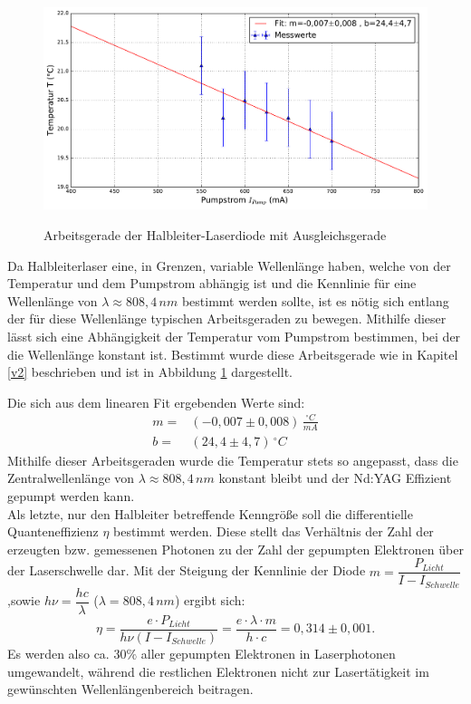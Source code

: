 \documentclass[twoside,colorback,accentcolor=tud4c,11pt]{tudreport}
\begin{document}
\begin{figure}[H]
\centering
   	\begin{minipage}[b]{0.85\textwidth}
   	\includegraphics[width=\textwidth]{graphics/arbeitsgerade_hld.pdf}
  	\label{ad}
   	\end{minipage}
\caption{Arbeitsgerade der Halbleiter-Laserdiode mit Ausgleichsgerade}	
\end{figure}
Da Halbleiterlaser eine, in Grenzen, variable Wellenlänge haben, welche von der Temperatur und dem Pumpstrom abhängig ist und die Kennlinie für eine Wellenlänge von $\lambda\approx 808,4\,\si{nm}$ bestimmt werden sollte, ist es nötig sich entlang der für diese Wellenlänge typischen Arbeitsgeraden zu bewegen. Mithilfe dieser lässt sich eine Abhängigkeit der Temperatur vom Pumpstrom bestimmen, bei der die Wellenlänge konstant ist. Bestimmt wurde diese Arbeitsgerade wie in Kapitel \ref{v2} beschrieben und ist in Abbildung \ref{ad} dargestellt.

Die sich aus dem linearen Fit ergebenden Werte sind:
\begin{align}
m=&(-0,007 \pm 0,008)\,\si{\frac{^{\circ} C}{mA}}\\
b=&(24,4 \pm 4,7)\,\si{^{\circ} C}
\end{align}
Mithilfe dieser Arbeitsgeraden wurde die Temperatur stets so angepasst, dass die Zentralwellenlänge von $\lambda\approx 808,4\,\si{nm}$ konstant bleibt und der Nd:YAG Effizient gepumpt werden kann.\\
Als letzte, nur den Halbleiter betreffende Kenngröße soll die differentielle Quanteneffizienz $\eta$ bestimmt werden. Diese stellt das Verhältnis der Zahl der erzeugten bzw. gemessenen Photonen zu der Zahl der gepumpten Elektronen über der Laserschwelle dar. Mit der Steigung der Kennlinie der Diode $m=\dfrac{P_{Licht}}{I-I_{Schwelle}}$,sowie $h\nu=\dfrac{hc}{\lambda}$ ($\lambda=808,4\,\si{nm}$) ergibt sich:
\begin{equation}
\eta=\frac{e\cdot P_{Licht}}{h\nu (I-I_{Schwelle})}=\frac{e\cdot\lambda\cdot m}{h\cdot c}=0,314 \pm 0,001.
\end{equation}
Es werden also ca. $30\%$ aller gepumpten Elektronen in Laserphotonen umgewandelt, während die restlichen Elektronen nicht zur Lasertätigkeit im gewünschten Wellenlängenbereich beitragen.
\end{document}
